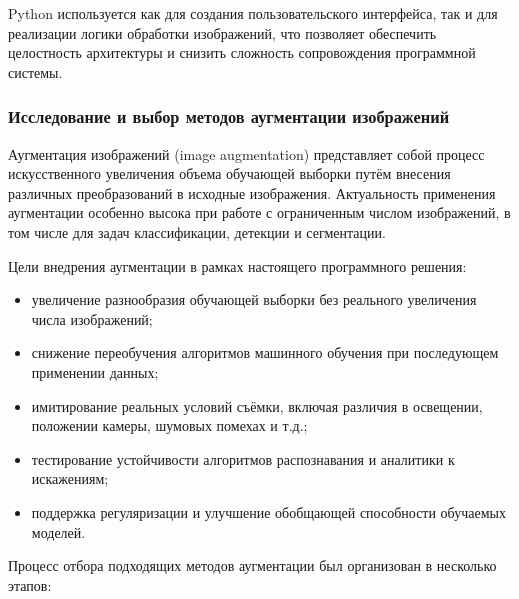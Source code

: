 Python используется как для создания пользовательского интерфейса, так и для реализации логики обработки изображений, что позволяет обеспечить целостность архитектуры и снизить сложность сопровождения программной системы.

\subsubsection{Исследование и выбор методов аугментации изображений}

Аугментация изображений (image augmentation) представляет собой процесс искусственного увеличения объема обучающей выборки путём внесения различных преобразований в исходные изображения. Актуальность применения аугментации особенно высока при работе с ограниченным числом изображений, в том числе для задач классификации, детекции и сегментации.

Цели внедрения аугментации в рамках настоящего программного решения:

\begin{itemize}
	\item увеличение разнообразия обучающей выборки без реального увеличения числа изображений;
	\item снижение переобучения алгоритмов машинного обучения при последующем применении данных;
	\item имитирование реальных условий съёмки, включая различия в освещении, положении камеры, шумовых помехах и т.д.;
	\item тестирование устойчивости алгоритмов распознавания и аналитики к искажениям;
	\item поддержка регуляризации и улучшение обобщающей способности обучаемых моделей.
\end{itemize}


Процесс отбора подходящих методов аугментации был организован в несколько этапов:

